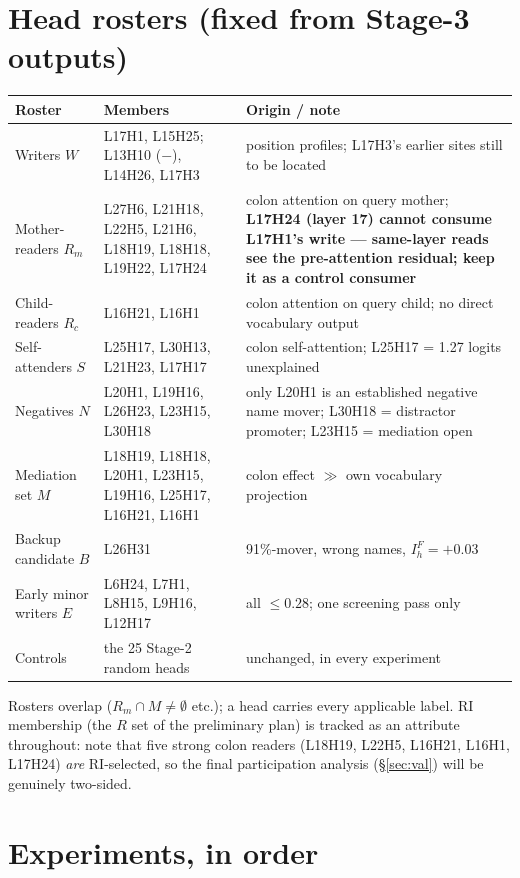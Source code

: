 \section{Head rosters (fixed from Stage-3 outputs)}
\label{sec:rosters}

\begin{center}\small
\begin{tabular}{llp{7.6cm}}
\toprule
Roster & Members & Origin / note \\
\midrule
Writers $W$ & L17H1, L15H25; L13H10 ($-$), L14H26, L17H3 & position profiles; L17H3's earlier sites still to be located \\
Mother-readers $R_m$ & L27H6, L21H18, L22H5, L21H6, L18H19, L18H18, L19H22, L17H24 & colon attention on query mother; \textbf{L17H24 (layer 17) cannot consume L17H1's write --- same-layer reads see the pre-attention residual; keep it as a control consumer} \\
Child-readers $R_c$ & L16H21, L16H1 & colon attention on query child; no direct vocabulary output \\
Self-attenders $S$ & L25H17, L30H13, L21H23, L17H17 & colon self-attention; L25H17 = 1.27 logits unexplained \\
Negatives $N$ & L20H1, L19H16, L26H23, L23H15, L30H18 & only L20H1 is an established negative name mover; L30H18 = distractor promoter; L23H15 = mediation open \\
Mediation set $M$ & L18H19, L18H18, L20H1, L23H15, L19H16, L25H17, L16H21, L16H1 & colon effect $\gg$ own vocabulary projection \\
Backup candidate $B$ & L26H31 & 91\%-mover, wrong names, $I^F_h=+0.03$ \\
Early minor writers $E$ & L6H24, L7H1, L8H15, L9H16, L12H17 & all $\le 0.28$; one screening pass only \\
Controls & the 25 Stage-2 random heads & unchanged, in every experiment \\
\bottomrule
\end{tabular}
\end{center}

Rosters overlap ($R_m \cap M \ne \emptyset$ etc.); a head carries every applicable
label. RI membership (the $R$ set of the preliminary plan) is tracked as an attribute
throughout: note that five strong colon readers (L18H19, L22H5, L16H21, L16H1, L17H24)
\emph{are} RI-selected, so the final participation analysis (\S\ref{sec:val}) will be
genuinely two-sided.

\section{Experiments, in order}

